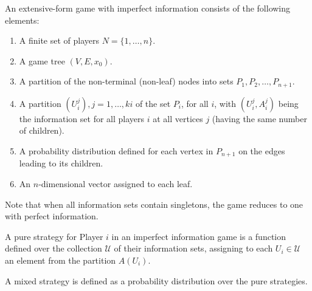 \begin{definition}
    An extensive-form game with imperfect information consists of the following elements:
    \begin{enumerate}
        \item A finite set of players $N = \{1, \dots, n\}$.
        \item A game tree $(V, E, x_0)$. 
        \item A partition of the non-terminal (non-leaf) nodes into sets $P_1, P_2, \dots, P_{n+1}$.
        \item A partition $(U^j_i), j = 1, \dots, ki$ of the set $P_i$, for all $i$, with $(U^j_i, A^j_i)$ being the information set for all players $i$ at all vertices $j$ (having the same number of children). 
        \item A probability distribution defined for each vertex in $P_{n+1}$ on the edges leading to its children.
        \item An $n$-dimensional vector assigned to each leaf.
    \end{enumerate}
\end{definition}
\noindent Note that when all information sets contain singletons, the game reduces to one with perfect information.
\begin{definition}
    A pure strategy for Player $i$ in an imperfect information game is a function defined over the collection $\mathcal{U}$ of their information sets, assigning to each $U_i\in\mathcal{U}$ an element from the partition $A(U_i)$. 
\end{definition}
\begin{definition}
    A mixed strategy is defined as a probability distribution over the pure strategies.
\end{definition}